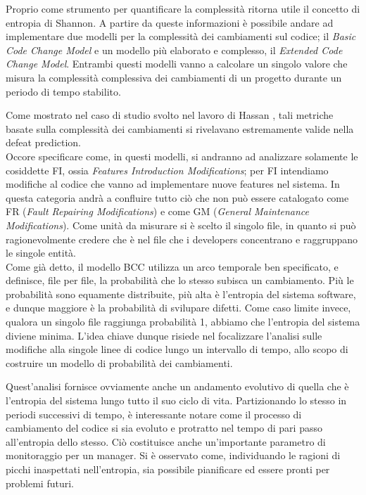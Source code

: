 Proprio come strumento per quantificare la complessità ritorna utile il concetto di entropia di Shannon. A partire da queste informazioni è possibile andare ad implementare due modelli per la complessità dei cambiamenti sul codice; il \textit{Basic Code Change Model} e un modello più elaborato e complesso, il \textit{Extended Code Change Model}. Entrambi questi modelli vanno a calcolare un singolo valore che misura la complessità complessiva dei cambiamenti di un progetto durante un periodo di tempo stabilito. 

Come mostrato nel caso di studio svolto nel lavoro di Hassan \cite{hassan2009predicting}, tali metriche basate sulla complessità dei cambiamenti si rivelavano estremamente valide nella defeat prediction.\\

Occore specificare come, in questi modelli, si andranno ad analizzare solamente le cosiddette FI, ossia \textit{Features Introduction Modifications}; per FI intendiamo modifiche al codice che vanno ad implementare nuove features nel sistema. In questa categoria andrà a confluire tutto ciò che non può essere catalogato come FR (\textit{Fault Repairing Modifications}) e come GM (\textit{General Maintenance Modifications}). Come unità da misurare si è scelto il singolo file, in quanto si può ragionevolmente credere che è nel file che i developers concentrano e raggruppano le singole entità.\\

Come già detto, il modello BCC utilizza un arco temporale ben specificato, e definisce, file per file, la probabilità che lo stesso subisca un cambiamento. Più le probabilità sono equamente distribuite, più alta è l'entropia del sistema software, e dunque maggiore è la probabilità di svilupare difetti. Come caso limite invece, qualora un singolo file raggiunga probabilità 1, abbiamo che l'entropia del sistema diviene minima. L'idea chiave dunque risiede nel focalizzare l'analisi sulle modifiche alla singole linee di codice lungo un intervallo di tempo, allo scopo di costruire un modello di probabilità dei cambiamenti.

Quest'analisi fornisce ovviamente anche un andamento evolutivo di quella che è l'entropia del sistema lungo tutto il suo ciclo di vita. Partizionando lo stesso in periodi successivi di tempo, è interessante notare come il processo di cambiamento del codice si sia evoluto e protratto nel tempo di pari passo all'entropia dello stesso. Ciò costituisce anche un'importante parametro di monitoraggio per un manager. Si è osservato come, individuando le ragioni di picchi inaspettati nell'entropia, sia possibile pianificare ed essere pronti per problemi futuri.\\

